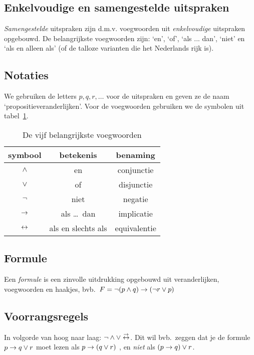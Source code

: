 \subsection{Enkelvoudige en samengestelde uitspraken}
\emph{Samengestelde} uitspraken zijn d.m.v. voegwoorden uit \emph{enkelvoudige} uitspraken opgebouwd. De belangrijkste voegwoorden zijn: `en', `of', `als ... dan', `niet' en `als en alleen als' (of de talloze varianten die het Nederlands rijk is).
\subsection{Notaties}
We gebruiken de letters $p, q, r, \ldots$ voor de uitspraken en geven ze de naam `propositieveranderlijken'. Voor de voegwoorden gebruiken we de symbolen uit tabel~\ref{tbl:voegwoorden}.


\begin{table}[htb]
  \centering
  \caption{De vijf belangrijkste voegwoorden}\label{tbl:voegwoorden}
\begin{tabular}{ccc}
\toprule
 symbool  & betekenis & benaming \\ \midrule
  $\wedge$ & en & conjunctie\index{conjunctie} \\
   $\vee$ & of & disjunctie\index{disjunctie} \\
   $\neg$ & niet & negatie\index{negatie} \\
   $\rightarrow$ & als \ldots\ dan & implicatie\index{implicatie} \\
   $\leftrightarrow$ & als en slechts als & equivalentie\index{equivalentie} \\
\bottomrule
\end{tabular}
\end{table}

\subsection{Formule}
Een \emph{formule} is een zinvolle uitdrukking opgebouwd uit veranderlijken, voegwoorden en haakjes,
bvb.\ $F = \neg (p \wedge q) \rightarrow (\neg r \vee p)$

\subsection{Voorrangsregels}
In volgorde van hoog naar laag: $\neg \wedge \vee \stackrel{\rightarrow}{\leftrightarrow}$. Dit wil bvb.\ zeggen dat je de formule  $p \rightarrow q \vee r$ moet lezen als $p \rightarrow (q \vee r)$ , en \emph{niet} als $(p \rightarrow q) \vee r$.

